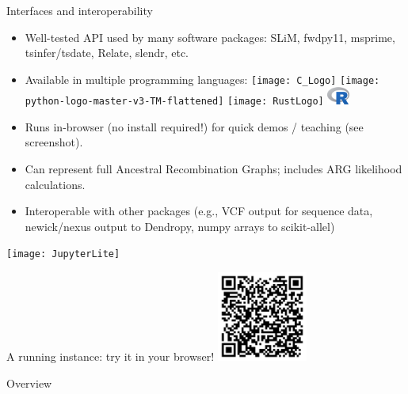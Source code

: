 \documentclass[landscape,a0paper,fontscale=0.5]{baposter}
\newcommand{\compresslist}{%
 \setlength{\itemsep}{1pt}%
 \setlength{\parskip}{0pt}%
 \setlength{\parsep}{0pt}%
 }
\begin{document}
\begin{poster}
\begin{posterbox}[name=interop,column=0,row=0,span=2,below=inout]{Interfaces and interoperability}
\begin{multicols}{2}
\begin{itemize} \compresslist
    \item Well-tested API used by many software packages: SLiM, fwdpy11, msprime, tsinfer/tsdate, Relate, slendr, etc.
    \item Available in multiple programming languages:
        \texttt{[image: C\_Logo]}
        \texttt{[image: python-logo-master-v3-TM-flattened]}
        \texttt{[image: RustLogo]}
        \includegraphics[width=2em]{R-logo}
    \item Runs in-browser (no install required!) for quick demos / teaching (see screenshot).
    \item Can represent full Ancestral Recombination Graphs; includes ARG likelihood calculations.
    \item Interoperable with other packages (e.g., VCF output for sequence data, newick/nexus output to Dendropy, numpy arrays to scikit-allel)
\end{itemize}

% 

    \texttt{[image: JupyterLite]}

    A running instance: try it in your browser!
    \includegraphics[width=8em]{running-instance-qr}

\end{multicols}

\end{posterbox}

\begin{posterbox}[name=overview,column=1,row=0,span=2]{Overview}


\end{posterbox}
\end{poster}
\end{document}
